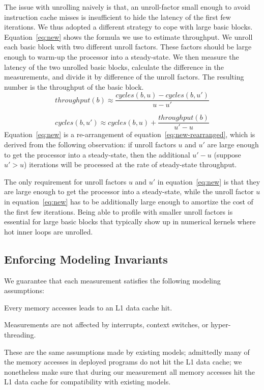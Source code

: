 The issue with unrolling naively is that,
an unroll-factor small enough to 
avoid instruction cache misses is 
insufficient to hide the latency of the first few iterations.
We thus adopted a different strategy to cope with large basic blocks.
Equation~\ref{eq:new} shows the formula we use to estimate throughput.
We unroll each basic block with two different unroll factors.
These factors should be large enough 
to warm-up the processor into a steady-state.
We then measure the latency of the two unrolled basic blocks,
calculate the difference in the measurements, and divide it 
by difference of the unroll factors.
The resulting number is the throughput of the basic block.
\begin{equation}
\mathit{throughput}(b) \approx 
\frac{\mathit{cycles}(b, u) - \mathit{cycles}(b, u')}{u-u'}
\label{eq:new}
\end{equation}

\begin{equation}
\mathit{cycles}(b, u') \approx 
\mathit{cycles}(b, u) + \frac{\mathit{throughput(b)}}{u'-u}
\label{eq:new-rearranged}
\end{equation}
Equation~\ref{eq:new} is a re-arrangement of equation~\ref{eq:new-rearranged},
which is derived from the following observation:
if unroll factors $u$ and $u'$ are large enough
to get the processor into a steady-state,
then the additional $u'-u$ (suppose $u' > u$) iterations will be processed at 
the rate of steady-state throughput.

The only requirement for unroll factors $u$ and $u'$ in equation~\ref{eq:new}
is that they are large enough to get the processor into a steady-state,
while the unroll factor $u$ in equation~\ref{eq:new} has to be additionally
large enough to amortize the cost of the first few iterations.
Being able to profile with smaller unroll factors is essential
for large basic blocks that typically show up in numerical kernels where
hot inner loops are unrolled.

\subsection{Enforcing Modeling Invariants}\label{sec:invariants}
We guarantee that each measurement satisfies the following modeling assumptions:
\begin{enumerate*}
    \item Every memory accesses leads to an L1 data cache hit. 
    \item Measurements are not affected by interrupts, context switches,
    or hyper-threading.
\end{enumerate*}
These are the same assumptions made by existing models;
admittedly many of the memory accesses in deployed programs do not hit the L1 data cache;
we nonetheless make sure that during our measurement all memory accesses hit the L1 data cache for compatibility with existing models.


